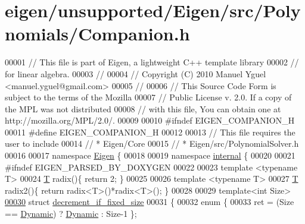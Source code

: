 \hypertarget{eigen_2unsupported_2_eigen_2src_2_polynomials_2_companion_8h_source}{}\section{eigen/unsupported/\+Eigen/src/\+Polynomials/\+Companion.h}
\label{eigen_2unsupported_2_eigen_2src_2_polynomials_2_companion_8h_source}

\begin{DoxyCode}
00001 \textcolor{comment}{// This file is part of Eigen, a lightweight C++ template library}
00002 \textcolor{comment}{// for linear algebra.}
00003 \textcolor{comment}{//}
00004 \textcolor{comment}{// Copyright (C) 2010 Manuel Yguel <manuel.yguel@gmail.com>}
00005 \textcolor{comment}{//}
00006 \textcolor{comment}{// This Source Code Form is subject to the terms of the Mozilla}
00007 \textcolor{comment}{// Public License v. 2.0. If a copy of the MPL was not distributed}
00008 \textcolor{comment}{// with this file, You can obtain one at http://mozilla.org/MPL/2.0/.}
00009 
00010 \textcolor{preprocessor}{#ifndef EIGEN\_COMPANION\_H}
00011 \textcolor{preprocessor}{#define EIGEN\_COMPANION\_H}
00012 
00013 \textcolor{comment}{// This file requires the user to include}
00014 \textcolor{comment}{// * Eigen/Core}
00015 \textcolor{comment}{// * Eigen/src/PolynomialSolver.h}
00016 
00017 \textcolor{keyword}{namespace }\hyperlink{namespace_eigen}{Eigen} \{ 
00018 
00019 \textcolor{keyword}{namespace }\hyperlink{namespaceinternal}{internal} \{
00020 
00021 \textcolor{preprocessor}{#ifndef EIGEN\_PARSED\_BY\_DOXYGEN}
00022 
00023 \textcolor{keyword}{template} <\textcolor{keyword}{typename} T>
00024 \hyperlink{group___sparse_core___module_class_eigen_1_1_triplet}{T} radix()\{ \textcolor{keywordflow}{return} 2; \}
00025 
00026 \textcolor{keyword}{template} <\textcolor{keyword}{typename} T>
00027 \hyperlink{group___sparse_core___module_class_eigen_1_1_triplet}{T} radix2()\{ \textcolor{keywordflow}{return} radix<T>()*radix<T>(); \}
00028 
00029 \textcolor{keyword}{template}<\textcolor{keywordtype}{int} Size>
\hyperlink{struct_eigen_1_1internal_1_1decrement__if__fixed__size}{00030} \textcolor{keyword}{struct }\hyperlink{struct_eigen_1_1internal_1_1decrement__if__fixed__size}{decrement\_if\_fixed\_size}
00031 \{
00032   \textcolor{keyword}{enum} \{
00033     ret = (Size == \hyperlink{namespace_eigen_ad81fa7195215a0ce30017dfac309f0b2}{Dynamic}) ? \hyperlink{namespace_eigen_ad81fa7195215a0ce30017dfac309f0b2}{Dynamic} : Size-1 \};

\end{DoxyCode}
